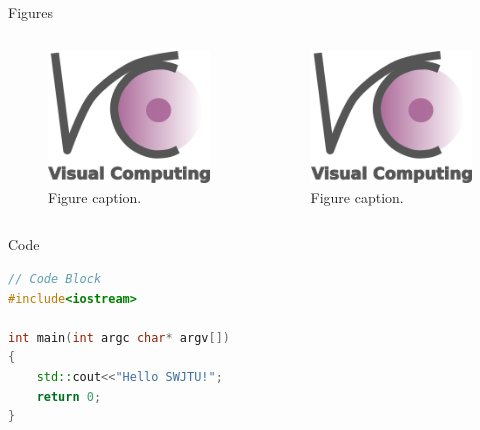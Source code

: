 \documentclass{beamer}
\begin{document}
\begin{frame}{Figures}
    \begin{columns}
            \begin{figure}
                \centering
                \includegraphics[scale = 0.08]{src/logo_name_blue.png}
                \caption{Figure caption.}
                \label{fig:dual fig demo 1}
            \end{figure}

        \begin{figure}
            \centering
            \includegraphics[scale = 0.08]{src/logo_name_blue.png}
            \caption{Figure caption.}
            \label{fig:dual fig demo 2}
        \end{figure}
\end{columns}
\end{frame}

\begin{frame}[fragile]{Code}
\begin{lstlisting}[language=C++]
// Code Block
#include<iostream>

int main(int argc char* argv[])
{
    std::cout<<"Hello SWJTU!";
    return 0;
}
\end{lstlisting}
\end{frame}
\end{document}
